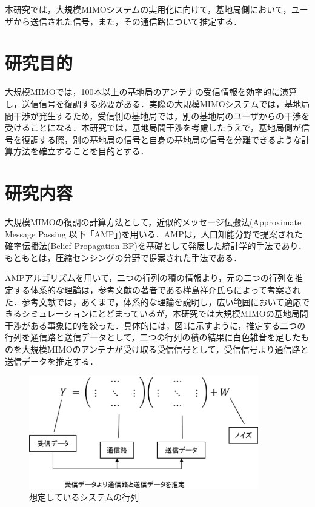 \documentclass[report]{jsbook}
\begin{document}
本研究では，大規模MIMOシステムの実用化に向けて，基地局側において，ユーザから送信された信号，また，その通信路について推定する．

\section{研究目的}
大規模MIMOでは，100本以上の基地局のアンテナの受信情報を効率的に演算し，送信信号を復調する必要がある．実際の大規模MIMOシステムでは，基地局間干渉が発生するため，受信側の基地局では，別の基地局のユーザからの干渉を受けることになる．本研究では，基地局間干渉を考慮したうえで，基地局側が信号を復調する際，別の基地局の信号と自身の基地局の信号を分離できるような計算方法を確立することを目的とする．

\section{研究内容}
大規模MIMOの復調の計算方法として，近似的メッセージ伝搬法(Approximate Message Passing 以下「AMP」)を用いる．AMPは，人口知能分野で提案された確率伝播法(Belief Propagation BP)を基礎として発展した統計学的手法であり．もともとは，圧縮センシングの分野で提案された手法である\cite{Donoho}．

AMPアルゴリズムを用いて，二つの行列の積の情報より，元の二つの行列を推定する体系的な理論は，参考文献\cite{kabashima}の著者である樺島祥介氏らによって考案された．参考文献\cite{kabashima}では，あくまで，体系的な理論を説明し，広い範囲において適応できるシミュレーションにとどまっているが，本研究では大規模MIMOの基地局間干渉がある事象に的を絞った．具体的には，図\ref{fig:matrix}に示すように，推定する二つの行列を通信路と送信データとして，二つの行列の積の結果に白色雑音を足したものを大規模MIMOのアンテナが受け取る受信信号として，受信信号より通信路と送信データを推定する．
\begin{figure}[htbp]
  \begin{center}
    \includegraphics[clip,width=10.0cm]{./matrix.eps}
    \caption{想定しているシステムの行列}
    \label{fig:matrix}
  \end{center}
\end{figure}
\end{document}
